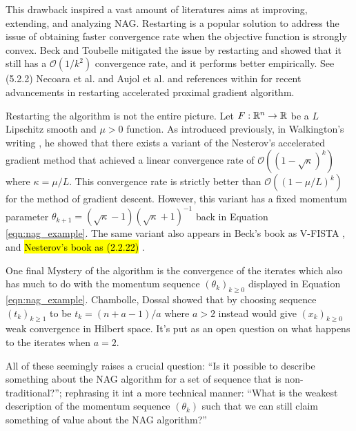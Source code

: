 \documentclass[12pt]{article}
\begin{document}
    This drawback inspired a vast amount of literatures aims at improving, extending, and analyzing NAG. 
    Restarting is a popular solution to address the issue of obtaining faster convergence rate when the objective function is strongly convex. 
    Beck and Toubelle \cite{beck_fast_2009}
    mitigated the issue by restarting and showed that it still has a $\mathcal O(1/k^2)$ convergence rate, and it performs better empirically. 
    See (5.2.2) Necoara et al. \cite{necoara_linear_2019} and Aujol et al. \cite{aujol_parameter-free_2024}
    and references within for recent advancements in restarting accelerated proximal gradient algorithm.
    \par
    Restarting the algorithm is not the entire picture. 
    Let $F:\mathbb R^n \rightarrow \mathbb R$ be a $L$ Lipschitz smooth and $\mu > 0$ function. 
    As introduced previously, in 
    Walkington's writing \cite{noel_nesterovs_nodate}, 
    he showed that there exists a variant of the Nesterov's accelerated gradient method that achieved a linear convergence rate of $\mathcal O((1 - \sqrt{\kappa})^k)$ where $\kappa = \mu/L$. 
    This convergence rate is strictly better than $\mathcal O((1 - \mu/L)^k)$ for the method of gradient descent. 
    However, this variant has a fixed momentum parameter $\theta_{k + 1} = (\sqrt{\kappa} - 1)(\sqrt{\kappa} + 1)^{-1}$ back in Equation \ref{eqn:nag_example}. 
    The same variant also appears in Beck's book as V-FISTA \cite[(10.7.7)]{beck_first-order_2017}, and \hl{Nesterov's book as (2.2.22)} \cite{nesterov_lectures_2018}.
    \par
    One final Mystery of the algorithm is the convergence of the iterates which also has much to do with the momentum sequence $(\theta_k)_{k\ge 0}$ displayed in Equation \ref{eqn:nag_example}. 
    Chambolle, Dossal \cite{chambolle_convergence_2015}
    showed that by choosing sequence $(t_k)_{k \ge 1}$ to be $t_k = (n + a - 1)/a$ where $a > 2$ instead would give $(x_k)_{k \ge 0}$ weak convergence in Hilbert space. 
    It's put as an open question on what happens to the iterates when $a = 2$. 
    \par
    All of these seemingly raises a crucial question: ``Is it possible to describe something about the NAG algorithm for a set of sequence that is non-traditional?''; rephrasing it int a more technical manner: ``What is the weakest description of the momentum sequence $(\theta_k)$ such that we can still claim something of value about the NAG algorithm?''
\end{document}
